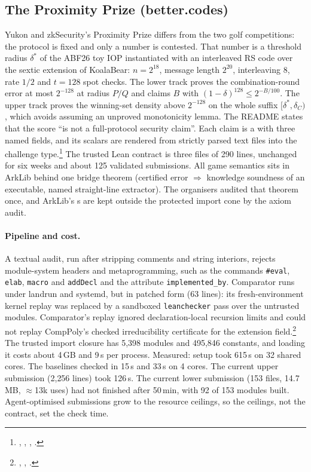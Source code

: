 \subsection{The Proximity Prize (better.codes)}\label{subsec:prior-proximity}

Yukon and zkSecurity's Proximity Prize differs from the two golf competitions: the protocol is
fixed and only a number is contested. That number is a threshold radius $\delta^\ast$ of the
ABF26 toy IOP \cite{ABF26} instantiated with an interleaved RS code over the sextic extension of
KoalaBear: $n=2^{18}$, message length $2^{20}$, interleaving 8, rate $1/2$ and $t=128$ spot
checks. The lower track proves the combination-round error  at most
$2^{-128}$ at radius $P/Q$ and claims $B$ with $(1-\delta)^{128}\le2^{-B/100}$. The upper track
proves the winning-set density above $2^{-128}$ on the whole suffix $[\delta^\ast,\delta_C)$,
which avoids assuming an unproved monotonicity lemma. The README states that the score ``is not a
full-protocol security claim''. Each claim is a  with three named
fields, and its scalars are rendered from strictly parsed text files into the challenge
type.\footnote{, ,
, .} The trusted Lean contract is three
files of 290 lines, unchanged for six weeks and about 125 validated submissions. All game
semantics sits in ArkLib behind one bridge theorem (certified error $\Rightarrow$ knowledge
soundness of an executable, named straight-line extractor). The organisers audited that theorem
once, and ArkLib's s are kept outside the protected import cone by the axiom audit.

\paragraph{Pipeline and cost.} A textual audit, run after stripping comments and string
interiors, rejects module-system headers and metaprogramming, such as the commands
\texttt{\#eval}, \texttt{elab}, \texttt{macro} and \texttt{addDecl} and the attribute
\texttt{implemented\_by}. Comparator runs under landrun and systemd, but in patched form
(63 lines): its fresh-environment kernel replay was replaced by a sandboxed \texttt{leanchecker}
pass over the untrusted modules. Comparator's replay ignored declaration-local recursion limits
and could not replay CompPoly's checked irreducibility certificate for the extension
field.\footnote{, ,
.} The trusted import closure has 5{,}398
modules and 495{,}846 constants, and loading it costs about 4\,GB and 9\,s per process. Measured:
setup took 615\,s on 32 shared cores. The baselines checked in 15\,s and 33\,s on 4 cores. The
current upper submission (2{,}256 lines) took 126\,s. The current lower submission (153 files,
14.7\,MB, $\approx$13k  uses) had not finished after 50\,min, with 92 of 153 modules
built. Agent-optimised submissions grow to the resource ceilings, so the ceilings, not the
contract, set the check time.

